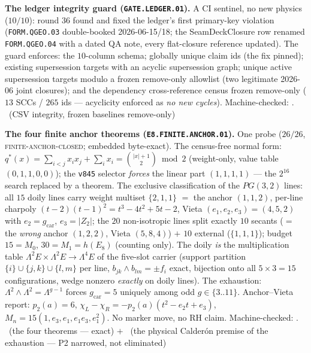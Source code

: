 \documentclass[11pt,a4paper]{article}
\newcommand{\gcar}{g_{\mathrm{car}}}
\theoremstyle{definition}
\begin{document}
\par\smallskip\noindent\textbf{The ledger integrity guard
(\texttt{GATE.LEDGER.01}).}
A CI sentinel, no new physics ($10/10$): round 36 found and
fixed the ledger's first primary-key violation
(\texttt{FORM.QGEO.03} double-booked 2026-06-15/18; the
SeamDeckClosure row renamed \texttt{FORM.QGEO.04} with a dated
QA note, every flat-closure reference updated).  The guard
enforces: the $10$-column schema; globally unique claim ids
(the fix pinned); existing supersession targets with an acyclic
supersession graph; unique active supersession targets modulo a
frozen remove-only allowlist (two legitimate 2026-06 joint
closures); and the dependency cross-reference census frozen
remove-only ($13$ SCCs / $265$ ids --- acyclicity enforced as
\emph{no new cycles}).
Machine-checked: .
\mE\ (CSV integrity, frozen baselines remove-only)
\par\smallskip

\par\smallskip\noindent\textbf{The four finite anchor theorems
(\texttt{E8.FINITE.\allowbreak ANCHOR.01}).}
One probe ($26/26$, \textsc{finite-anchor-closed}; embedded
byte-exact).  The census-free normal form: $q^{*}(x) = \sum_{i<j}
x_i x_j + \sum_i x_i = \binom{|x|+1}{2} \bmod 2$ (weight-only,
value table $(0,1,1,0,0)$); the \texttt{v845} selector
\emph{forces} the linear part $(1,1,1,1)$ --- the $2^{16}$ search
replaced by a theorem.  The exclusive classification of the
$PG(3,2)$ lines: all $15$ doily lines carry weight multiset
$\{2,1,1\}$ $=$ the anchor $(1,1,2)$, per-line charpoly
$(t-2)(t-1)^2 = t^3 - 4t^2 + 5t - 2$, Vieta $(e_1,e_2,e_3) =
(4,5,2)$ with $e_2 = \gcar$, $e_3 = |Z_2|$; the $20$
non-isotropic lines split exactly $10$ secants ($=$ the
\emph{wrong} anchor $(1,2,2)$, Vieta $(5,8,4)$) $+$ $10$ external
($\{1,1,1\}$); budget $15 = M_0$, $30 = M_1 = h(E_8)$ (counting
only).  The doily \emph{is} the multiplication table $\Lambda^2 E
\times \Lambda^2 E \to \Lambda^4 E$ of the five-slot carrier
(support partition $\{i\} \cup \{j,k\} \cup \{l,m\}$ per line,
$b_{jk} \wedge b_{lm} = \pm f_i$ exact, bijection onto all
$5\times3 = 15$ configurations, wedge nonzero \emph{exactly} on
doily lines).  The exhaustion: $\Lambda^2 \wedge \Lambda^2 =
\Lambda^{g-1}$ forces $\gcar = 5$ uniquely among odd $g \in
\{3..11\}$.  Anchor--Vieta report: $p_2(a) = 6$, $\chi_L -
\chi_R = -p_2(a)(t^2 - e_2 t + e_3)$, $M_n = 15(1, e_3, e_1,
e_1 e_3, e_1^2)$.  No marker move, no RH claim.
Machine-checked: .
\mE\ (the four theorems --- exact) $+$ \mO\ (the physical
Calder\'on premise of the exhaustion --- P2 narrowed, not
eliminated)
\par\smallskip
\end{document}
